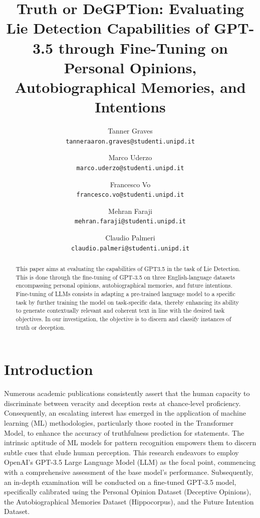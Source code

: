 \documentclass[10pt,twocolumn,letterpaper]{article}
\begin{document}
\title{Truth or DeGPTion: Evaluating Lie Detection Capabilities of GPT-3.5 through Fine-Tuning on Personal Opinions, Autobiographical Memories, and Intentions}


\author{
Tanner Graves\\
{\tt\small tanneraaron.graves@studenti.unipd.it}
\and
Marco Uderzo\\
{\tt\small marco.uderzo@studenti.unipd.it}
\and
Francesco Vo \\
{\tt\small francesco.vo@studenti.unipd.it}
\and
Mehran Faraji\\
{\tt\small mehran.faraji@studenti.unipd.it}
\and
Claudio Palmeri \\
{\tt\small claudio.palmeri@studenti.unipd.it}
}

\maketitle


\begin{abstract}
This paper aims at evaluating the capabilities of GPT3.5 in the task of Lie Detection.
This is done through the fine-tuning of GPT-3.5 on three English-language datasets encompassing 
personal opinions, autobiographical memories, and future intentions. 
Fine-tuning of LLMs consists in adapting a pre-trained language model to a specific 
task by further training the model on task-specific data, thereby 
enhancing its ability to generate contextually relevant and coherent text in 
line with the desired task objectives. In our investigation, the objective is to 
discern and classify instances of truth or deception.

\end{abstract}

\section{Introduction}
Numerous academic publications consistently assert that the human capacity to discriminate 
between veracity and deception rests at chance-level proficiency. Consequently, an escalating 
interest has emerged in the application of machine learning (ML) methodologies, particularly 
those rooted in the Transformer Model, to enhance the accuracy of truthfulness prediction for statements. 
The intrinsic aptitude of ML models for pattern recognition empowers them to discern subtle cues 
that elude human perception. This research endeavors to employ OpenAI's GPT-3.5 Large Language Model (LLM) 
as the focal point, commencing with a comprehensive assessment of the base model's performance. Subsequently, 
an in-depth examination will be conducted on a fine-tuned GPT-3.5 model, specifically calibrated using the 
Personal Opinion Dataset (Deceptive Opinions), the Autobiographical Memories Dataset (Hippocorpus), and the 
Future Intention Dataset.
\end{document}
